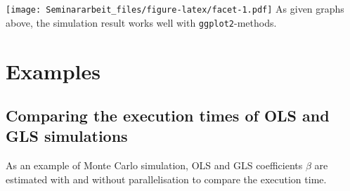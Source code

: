 \documentclass[11pt,a4paper]{article}
\begin{document}
\texttt{[image: Seminararbeit\_files/figure-latex/facet-1.pdf]} As given
graphs above, the simulation result works well with
\texttt{ggplot2}-methods.

\pagebreak

\hypertarget{examples}{%
\section{Examples}\label{examples}}

\hypertarget{comparing-the-execution-times-of-ols-and-gls-simulations}{%
\subsection{Comparing the execution times of OLS and GLS
simulations}\label{comparing-the-execution-times-of-ols-and-gls-simulations}}

As an example of Monte Carlo simulation, OLS and GLS coefficients
\(\beta\) are estimated with and without parallelisation to compare the
execution time.
\end{document}
